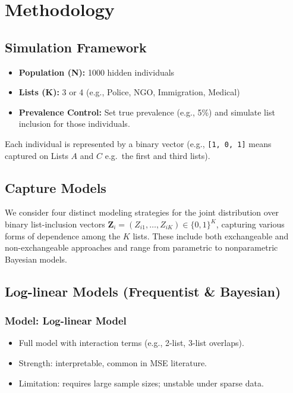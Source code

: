 \documentclass[
  12pt,
]{article}
\providecommand{\tightlist}{%
  \setlength{\itemsep}{0pt}\setlength{\parskip}{0pt}}\usepackage{longtable,booktabs,array}
\theoremstyle{plain}
\theoremstyle{definition}
\begin{document}
\section{Methodology}\label{methodology}

\subsection{Simulation Framework}\label{simulation-framework}

\begin{itemize}
\tightlist
\item
  \textbf{Population (N):} 1000 hidden individuals
\item
  \textbf{Lists (K):} 3 or 4 (e.g., Police, NGO, Immigration, Medical)
\item
  \textbf{Prevalence Control:} Set true prevalence (e.g., 5\%) and
  simulate list inclusion for those individuals.
\end{itemize}

Each individual is represented by a binary vector (e.g.,
\texttt{{[}1,\ 0,\ 1{]}} means captured on Lists \(A\) and \(C\)
e.g.~the first and third lists).

\subsection{Capture Models}\label{capture-models}

We consider four distinct modeling strategies for the joint distribution
over binary list-inclusion vectors
\(\mathbf{Z}_i = (Z_{i1}, \ldots, Z_{iK}) \in \{0,1\}^K\), capturing
various forms of dependence among the \(K\) lists. These include both
exchangeable and non-exchangeable approaches and range from parametric
to nonparametric Bayesian models.

\subsection{Log-linear Models (Frequentist \&
Bayesian)}\label{log-linear-models-frequentist-bayesian}

\subsubsection{Model: Log-linear Model}\label{model-log-linear-model}

\begin{itemize}
\tightlist
\item
  Full model with interaction terms (e.g., 2-list, 3-list overlaps).
\item
  Strength: interpretable, common in MSE literature.
\item
  Limitation: requires large sample sizes; unstable under sparse data.
\end{itemize}
\end{document}
